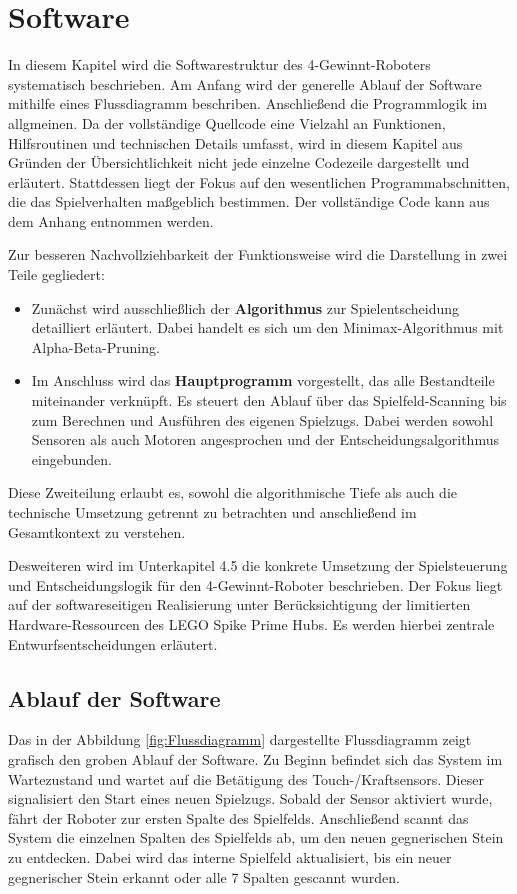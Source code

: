 \section{Software}
In diesem Kapitel wird die Softwarestruktur des 4-Gewinnt-Roboters systematisch beschrieben. 
Am Anfang wird der generelle Ablauf der Software mithilfe eines Flussdiagramm beschriben. Anschließend die Programmlogik im allgmeinen.
Da der vollständige Quellcode eine Vielzahl an Funktionen, Hilfsroutinen und technischen Details umfasst, wird in diesem Kapitel aus Gründen der Übersichtlichkeit nicht jede einzelne Codezeile dargestellt und erläutert.
Stattdessen liegt der Fokus auf den wesentlichen Programmabschnitten, die das Spielverhalten maßgeblich bestimmen. Der vollständige Code kann aus dem Anhang entnommen werden.

Zur besseren Nachvollziehbarkeit der Funktionsweise wird die Darstellung in zwei Teile gegliedert:

\begin{itemize}
	\item Zunächst wird ausschließlich der \textbf{Algorithmus} zur Spielentscheidung detailliert erläutert. Dabei handelt es sich um den Minimax-Algorithmus mit Alpha-Beta-Pruning.
	
	\item Im Anschluss wird das \textbf{Hauptprogramm} vorgestellt, das alle Bestandteile miteinander verknüpft. Es steuert den Ablauf über das Spielfeld-Scanning bis zum Berechnen und Ausführen des eigenen Spielzugs. Dabei werden sowohl Sensoren als auch Motoren angesprochen und der Entscheidungsalgorithmus eingebunden.
\end{itemize}

Diese Zweiteilung erlaubt es, sowohl die algorithmische Tiefe als auch die technische Umsetzung getrennt zu betrachten und anschließend im Gesamtkontext zu verstehen.

Desweiteren wird im Unterkapitel 4.5 die konkrete Umsetzung der Spielsteuerung und Entscheidungslogik für den 4-Gewinnt-Roboter beschrieben. Der Fokus liegt auf der softwareseitigen Realisierung unter Berücksichtigung der limitierten Hardware-Ressourcen des LEGO Spike Prime Hubs. Es werden hierbei zentrale Entwurfsentscheidungen erläutert.


\subsection{Ablauf der Software}
Das in der Abbildung \ref{fig:Flussdiagramm} dargestellte Flussdiagramm zeigt grafisch den groben Ablauf der Software. \newline
Zu Beginn befindet sich das System im Wartezustand und wartet auf die Betätigung des Touch-/Kraftsensors. Dieser signalisiert den Start eines neuen Spielzugs. Sobald der Sensor aktiviert wurde, fährt der Roboter zur ersten Spalte des Spielfelds.
Anschließend scannt das System die einzelnen Spalten des Spielfelds ab, um den neuen gegnerischen Stein zu entdecken. Dabei wird das interne Spielfeld aktualisiert, bis ein neuer gegnerischer Stein erkannt oder alle 7 Spalten gescannt wurden.

